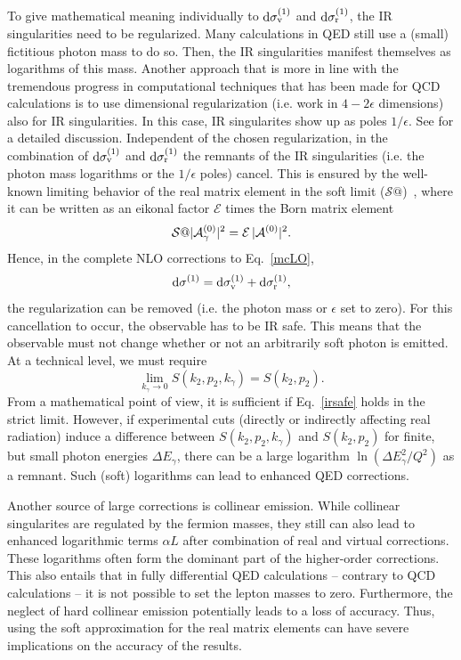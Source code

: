 To give mathematical meaning individually to $\mathrm{d} \sigma^{(1)}_{\rm v}$
and $\mathrm{d} \sigma^{(1)}_{\rm r}$, the IR singularities need to be
regularized. Many calculations in QED still use a (small) fictitious
photon mass to do so. Then, the IR singularities manifest themselves as
logarithms of this mass. Another approach that is more in line with
the tremendous progress in computational techniques that has been made
for QCD calculations is to use dimensional regularization (i.e. work in
$4-2\epsilon$ dimensions) also for IR singularities. In this case,
IR singularites show up as poles $1/\epsilon$. See  for a detailed discussion. Independent of the
chosen regularization, in the combination of $\mathrm{d} \sigma^{(1)}_{\rm v}$
and $\mathrm{d} \sigma^{(1)}_{\rm r}$ the remnants of the IR singularities
(i.e. the photon mass logarithms or the $1/\epsilon$ poles)
cancel. This is ensured by the well-known limiting behavior of the
real matrix element in the soft limit ($\mathcal{S}@$)~\cite{Yennie:1961ad}, where it
can be written as an eikonal factor $\mathcal{E}$ times the Born
matrix element
\begin{equation}\label{eikonal}
\mathcal{S}@ |{\mathcal A}_\gamma^{(0)}|^2 = \mathcal{E}\,|{\mathcal A}^{(0)}|^2 . 
\end{equation}
Hence, in the complete NLO corrections to Eq.~\ref{mcLO},
\begin{equation}\label{mcNLO}
\mathrm{d} \sigma^{(1)} = \mathrm{d} \sigma^{(1)}_{\rm v} + \mathrm{d} \sigma^{(1)}_{\rm r} ,
\end{equation}
the regularization can be removed (i.e. the photon mass
or $\epsilon$ set to zero). For this cancellation to occur, the
observable has to be IR safe. This means that the observable must not
change whether or not an arbitrarily soft photon is emitted. At a
technical level, we must require
\begin{equation}\label{irsafe}
  \lim_{k_\gamma \to 0} S(k_2,p_2,k_\gamma) = S(k_2,p_2) .
\end{equation}  
From a mathematical point of view, it is sufficient if Eq.~\ref{irsafe}
holds in the strict limit. However, if experimental cuts (directly or
indirectly affecting real radiation) induce a difference between
$S(k_2,p_2,k_\gamma)$ and $S(k_2,p_2)$ for finite, but small photon
energies $\Delta{E_\gamma}$, there can be a large logarithm
$\ln\left(\Delta{E_\gamma^2}/Q^2\right)$ as a remnant. Such (soft) logarithms can lead
to enhanced QED corrections.

Another source of large corrections is collinear emission. While
collinear singularites are regulated by the fermion masses, they still
can also lead to enhanced logarithmic terms $\alpha L$ after
combination of real and virtual corrections. These logarithms often
form the dominant part of the higher-order corrections. This also
entails that in fully differential QED calculations -- contrary to QCD
calculations -- it is not possible to set the lepton masses to
zero. Furthermore, the neglect of hard collinear emission potentially leads
to a loss of accuracy. Thus, using the soft approximation for the real
matrix elements can have severe implications on the accuracy of the
results. 

